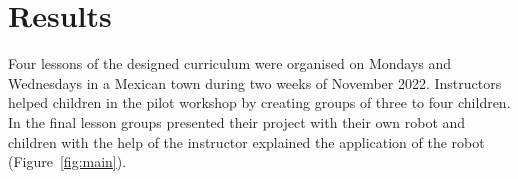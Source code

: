 \documentclass[sigconf]{acmart}
\begin{document}

\section{Results}
Four lessons of the designed curriculum were organised on Mondays and Wednesdays in a Mexican town during two weeks of November 2022. 
Instructors helped children in the pilot workshop by creating groups of three to four children.
In the final lesson groups presented their project with their own robot and children with the help of the instructor explained the application of the robot (Figure~\ref{fig:main}).
\end{document}
